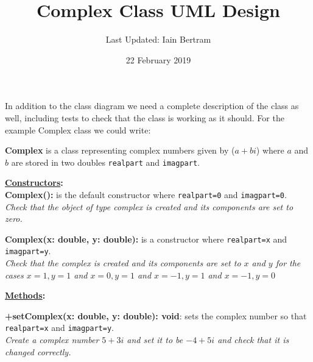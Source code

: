 \documentclass[11pt,a4paper]{article}
\begin{document}
\title{\textbf{Complex Class UML Design}}
\author{Last Updated: Iain Bertram}
\date{22 February 2019}
\maketitle


\begin{center}
\end{center}


In addition to the class diagram we need a complete description of the
class as well, including tests to check that the class is working as
it should. For the example Complex class we could write:

{\bf Complex} is a class representing complex numbers given by ($a +
bi$) where $a$ and $b$ are stored in two doubles \texttt{realpart} and
\texttt{imagpart}.

{\bf \underline{Constructors}:}\\
{\bf Complex():} is the default constructor where \texttt{realpart=0} and
\texttt{imagpart=0}. \\
{\it Check that the object of type complex is created and its components are set to zero.}

{\bf Complex(x: double, y: double):} is a constructor where
\texttt{realpart=x} and \texttt{imagpart=y}. \\
{\it Check that the complex is created and its components are set to $x$ and $y$ for the cases $x=1, y=1$ and $x=0, y=1$ and $x=-1, y=1$ and $x=-1, y=0$}


{\bf \underline{Methods}:}

{\bf +setComplex(x: double, y: double): void}: sets the complex number
so that \texttt{realpart=x} and \texttt{imagpart=y}. \\
{\it Create a complex number $5+3i$ and set it to be $-4+5i$ and check
  that it is changed correctly.}
\end{document}
